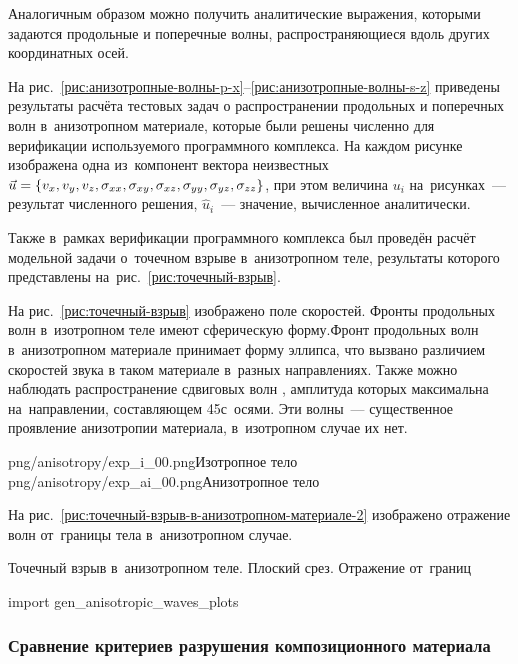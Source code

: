 \documentclass[thesis.tex]{subfiles}
\begin{document}
Аналогичным образом можно получить аналитические выражения, которыми задаются продольные и поперечные волны,
распространяющиеся вдоль других координатных осей.

На рис.~\ref{рис:анизотропные-волны-p-x}--\ref{рис:анизотропные-волны-s-z} приведены результаты расчёта тестовых задач
о распространении продольных и поперечных волн в~анизотропном материале, которые были решены численно для верификации
используемого программного комплекса. На каждом рисунке изображена одна из~компонент вектора неизвестных
$\vec u = \{v_x, v_y, v_z, \sigma_{xx}, \sigma_{xy}, \sigma_{xz}, \sigma_{yy}, \sigma_{yz}, \sigma_{zz}\}$,  при этом величина $u_i$  на~рисунках~--- результат
численного решения,  $\hat u_i$~--- значение, вычисленное аналитически.


Также в~рамках верификации программного комплекса был проведён расчёт модельной задачи о~точечном взрыве в~анизотропном
теле, результаты которого представлены на~рис.~\ref{рис:точечный-взрыв}.

На рис.~\ref{рис:точечный-взрыв} изображено поле скоростей. Фронты продольных волн в~изотропном теле имеют сферическую
форму.Фронт продольных волн в~анизотропном материале принимает форму эллипса, что вызвано различием скоростей звука в
таком материале в~разных направлениях. Также можно наблюдать распространение сдвиговых волн \cite {огурцов1969анализ},
амплитуда которых максимальна на~направлении, составляющем 45\degree с~осями. Эти волны~--- существенное проявление
анизотропии материала, в~изотропном случае их нет.

        {png/anisotropy/exp_i_00.png}{Изотропное тело}
        {png/anisotropy/exp_ai_00.png}{Анизотропное тело}


На рис.~\ref{рис:точечный-взрыв-в-анизотропном-материале-2} изображено отражение волн от~границы тела в~анизотропном
случае.

        {Точечный взрыв в~анизотропном теле. Плоский срез. Отражение от~границ}

\begin{python}
    import gen_anisotropic_waves_plots
\end{python}

\clearpage

\subsubsection[Сравнение критериев разрушения\\композиционного материала]{Сравнение критериев разрушения композиционного материала}
\end{document}
